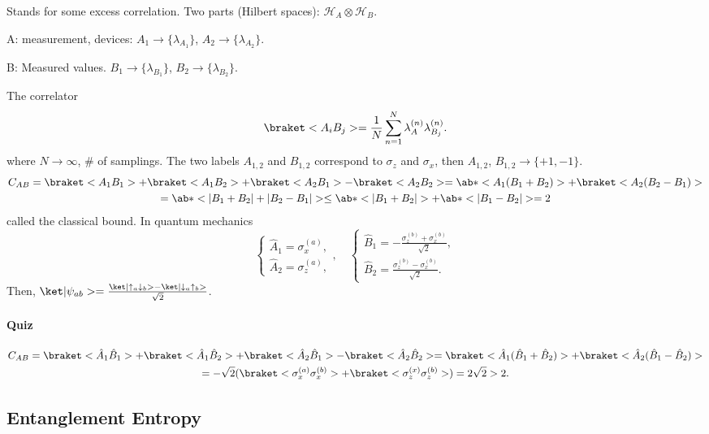 Stands for some excess correlation.
Two parts (Hilbert spaces): $\mathcal H_A \otimes \mathcal H_B$.
\begin{enumext}
  \item A: measurement, devices: $A_1 \to \{\lambda_{A_1}\}$,
  $A_2 \to \{\lambda_{A_2}\}$.
  \item B: Measured values.
  $B_1 \to \{\lambda_{B_1}\}$, $B_2 \to \{\lambda_{B_2}\}$.
\end{enumext}
The correlator
\[
  \braket<A_iB_j> = \frac1N \sum_{n=1}^N \lambda_A^{(n)} \lambda_{B_j}^{(n)}.
\]
where $N \to \infty$, \# of samplings. The two labels $A_{1,2}$ and $B_{1,2}$
correspond to $\sigma_z$ and $\sigma_x$,
then $A_{1,2}$, $B_{1,2} \to \{+1, -1\}$.
\begin{multline*}
  C_{AB} = \braket<A_1B_1> + \braket<A_1B_2> + \braket<A_2B_1>
         - \braket<A_2B_2>
  = \ab*<A_1(B_1 + B_2)> + \braket<A_2(B_2 - B_1)>\\
  = \ab*<|B_1 + B_2| + |B_2 - B_1|>
  \leq \ab*<|B_1 + B_2|> + \ab*<|B_1 - B_2|> = 2
\end{multline*}
called the classical bound.
In quantum mechanics
\[
  \begin{cases}
    \hat A_1 = \sigma_x^{(a)},\\
    \hat A_2 = \sigma_z^{(a)},
  \end{cases},\quad
  \begin{cases}
    \hat B_1 = -\frac{\sigma_z^{(b)} + \sigma_x^{(b)}}{\sqrt2},\\
    \hat B_2 = \frac{\sigma_z^{(b)} - \sigma_x^{(b)}}{\sqrt2}.
  \end{cases}
\]
Then, $\ket|\psi_{ab}> = \frac{\ket|\uparrow_a\downarrow_b>
- \ket|\downarrow_a\uparrow_b>}{\sqrt2}$.

\paragraph{Quiz}
\begin{multline*}
  C_{AB} = \braket<\hat A_1\hat B_1> + \braket<\hat A_1\hat B_2>
  + \braket<\hat A_2\hat B_1> - \braket<\hat A_2\hat B_2>
= \braket<\hat A_1(\hat B_1 + \hat B_2)> +
  \braket<\hat A_2(\hat B_1 - \hat B_2)>\\
= -\sqrt2(\braket<\sigma_x^{(a)}\sigma_x^{(b)}>
        + \braket<\sigma_z^{(x)}\sigma_z^{(b)}>) = 2\sqrt2 > 2.
\end{multline*}

\subsection{Entanglement Entropy}

